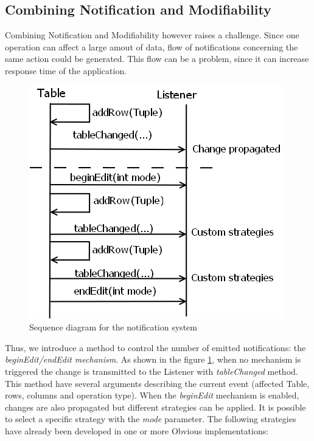 \subsection{Combining Notification and Modifiability}
\label{sub:combiningnotif}

Combining Notification and Modifiability however raises a challenge. Since one operation can affect a large amout of data, flow of notifications concerning the same action could be generated. This flow can be a problem, since it can increase response time of the application.

\begin{figure}[!ht]
\includegraphics[width=\columnwidth]{figures/notification}
\caption{Sequence diagram for the notification system}
\label{fig:notification}
\end{figure}

Thus, we introduce a method to control the number of emitted notifications: the \emph{beginEdit/endEdit mechanism}. As shown in the figure \ref{fig:notification}, when no mechanism is triggered the change is transmitted to the Listener with \emph{tableChanged} method. This method have several arguments describing the current event (affected Table, rows, columns and operation type). When the \emph{beginEdit} mechanism is enabled, changes are also propagated but different strategies can be applied. It is possible to select a specific strategy with the \emph{mode} parameter. The following strategies have already been developed  in one or more Obvious implementations:

